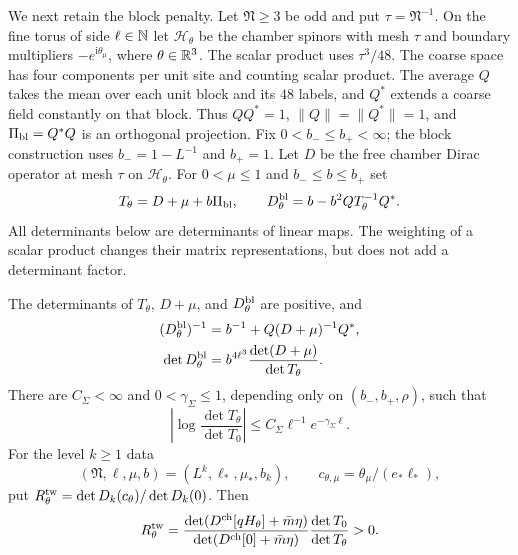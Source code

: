 We next retain the block penalty. Let $\mathfrak N\ge3$
be odd and put $\tau=\mathfrak N^{-1}$.
On the fine torus of side $\ell\in\mathbb N$ let
$\mathcal H_\theta$ be the chamber spinors with mesh $\tau$
and boundary multipliers $-e^{\mathrm i\theta_\mu}$,
where $\theta\in\mathbb R^3$.
The scalar product uses $\tau^3/48$.
The coarse space has four components per unit site and
counting scalar product. The average $Q$ takes the mean
over each unit block and its $48$ labels, and $Q^*$
extends a coarse field constantly on that block.
Thus $QQ^*=1$, $\|Q\|=\|Q^*\|=1$, and
$\Pi_{\rm bl}=Q^*Q$ is an orthogonal projection.
Fix $0<b_-\le b_+<\infty$; the block construction uses
$b_-=1-L^{-1}$ and $b_+=1$.
Let $D$ be the free chamber Dirac operator at mesh $\tau$
on $\mathcal H_\theta$. For $0<\mu\le1$ and $b_-\le b\le b_+$ set
\begin{equation}\label{eq:term-free-block-operators}
 T_\theta=D+\mu+b\Pi_{\rm bl},\qquad
 D_\theta^{\rm bl}=b-b^2QT_\theta^{-1}Q^*.
\end{equation}
All determinants below are determinants of linear maps.
The weighting of a scalar product changes their matrix
representations, but does not add a determinant factor.

\begin{proposition}\label{prop:term-block-twist}
The determinants of $T_\theta$, $D+\mu$, and
$D_\theta^{\rm bl}$ are positive, and
\begin{align}
 (D_\theta^{\rm bl})^{-1}
     &=b^{-1}+Q(D+\mu)^{-1}Q^*,
                                    \label{eq:term-free-block-inverse}\\
 \det D_\theta^{\rm bl}
     &=b^{4\ell^3}\frac{\det(D+\mu)}{\det T_\theta}.
                                    \label{eq:term-free-block-determinant}
\end{align}
There are $C_\Sigma<\infty$ and $0<\gamma_\Sigma\le1$,
depending only on $(b_-,b_+,\rho)$, such that
\begin{equation}\label{eq:term-penalty-twist-bound}
 \left|\log\frac{\det T_\theta}{\det T_0}\right|
                  \le C_\Sigma\ell^{-1}e^{-\gamma_\Sigma\ell}.
\end{equation}
For the level $k\ge1$ data
\[
             (\mathfrak N,\ell,\mu,b)=(L^k,\ell_*,\mu_*,b_k),
             \qquad c_{\theta,\mu}=\theta_\mu/(e_*\ell_*),
\]
put
$R_\theta^{\rm tw}=\det D_k(c_\theta)/\det D_k(0)$.
Then
\begin{equation}\label{eq:term-twist-determinant-identity}
 R_\theta^{\rm tw}
 =\frac{\det(D^{\rm ch}[qH_\theta]+\bar m\eta)}
              {\det(D^{\rm ch}[0]+\bar m\eta)}
                  \frac{\det T_0}{\det T_\theta}>0.
\end{equation}
\end{proposition}

